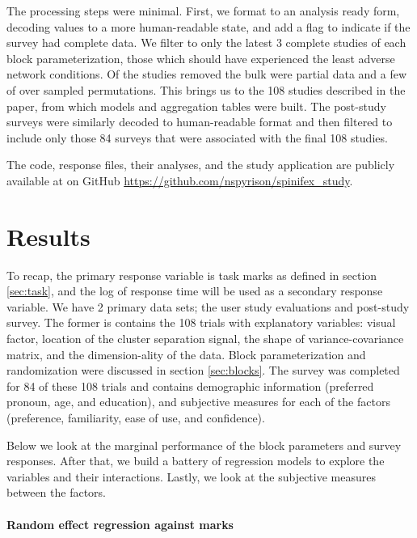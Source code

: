 \documentclass{template/monashthesis}
\begin{document}
The processing steps were minimal. First, we format to an analysis ready form, decoding values to a more human-readable state, and add a flag to indicate if the survey had complete data. We filter to only the latest 3 complete studies of each block parameterization, those which should have experienced the least adverse network conditions. Of the studies removed the bulk were partial data and a few of over sampled permutations. This brings us to the 108 studies described in the paper, from which models and aggregation tables were built. The post-study surveys were similarly decoded to human-readable format and then filtered to include only those 84 surveys that were associated with the final 108 studies.

The code, response files, their analyses, and the study application are publicly available at on GitHub \url{https://github.com/nspyrison/spinifex_study}.

\hypertarget{sec:results}{%
\section{Results}\label{sec:results}}

To recap, the primary response variable is task marks as defined in section \ref{sec:task}, and the log of response time will be used as a secondary response variable. We have 2 primary data sets; the user study evaluations and post-study survey. The former is contains the 108 trials with explanatory variables: visual factor, location of the cluster separation signal, the shape of variance-covariance matrix, and the dimension-ality of the data. Block parameterization and randomization were discussed in section \ref{sec:blocks}. The survey was completed for 84 of these 108 trials and contains demographic information (preferred pronoun, age, and education), and subjective measures for each of the factors (preference, familiarity, ease of use, and confidence).

Below we look at the marginal performance of the block parameters and survey responses. After that, we build a battery of regression models to explore the variables and their interactions. Lastly, we look at the subjective measures between the factors.

\hypertarget{random-effect-regression-against-marks}{%
\paragraph{Random effect regression against marks}\label{random-effect-regression-against-marks}}
\end{document}
